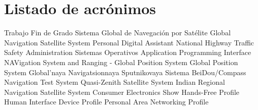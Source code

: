 \chapter{Listado de acrónimos}

{\small
\begin{acronym}[XXXXXXXX]
       {Trabajo Fin de Grado}
      {Sistema Global de Navegación por Satélite}
      {Global Navigation Satellite System}
       {Personal Digital Assistant}
     {National Highway Traffic Safety Administration}
        {Sistemas Operativos}
       {Application Programming Interface}
   {NAVigation System and Ranging - Global Position System}
       {Global Position System}
   {Global'naya Navigatsionnaya Sputnikovaya Sistema}
      {BeiDou/Compass Navigation Test System}
      {Quasi-Zenith Satellite System} 
     {Indian Regional Navigation Satellite System}
       {Consumer Electronics Show}
       {Hands-Free Profile}
       {Human Interface Device Profile}
       {Personal Area Networking Profile}
\end{acronym}
}




